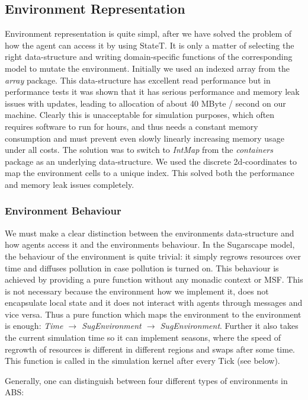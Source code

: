 \subsection{Environment Representation}
Environment representation is quite simpl, after we have solved the problem of how the agent can access it by using StateT. It is only a matter of selecting the right data-structure and writing domain-specific functions of the corresponding model to mutate the environment. Initially we used an indexed array from the \textit{array} package. This data-structure has excellent read performance but in performance tests it was shown that it has serious performance and memory leak issues with updates, leading to allocation of about 40 MByte / second on our machine. Clearly this is unacceptable for simulation purposes, which often requires software to run for hours, and thus needs a constant memory consumption and must prevent even slowly linearly increasing memory usage under all costs. The solution was to switch to \textit{IntMap} from the \textit{containers} package as an underlying data-structure. We used the discrete 2d-coordinates to map the environment cells to a unique index. This solved both the performance and memory leak issues completely.

\subsubsection{Environment Behaviour}
We must make a clear distinction between the environments data-structure and how agents access it and the environments behaviour. In the Sugarscape model, the behaviour of the environment is quite trivial: it simply regrows resources over time and diffuses pollution in case pollution is turned on. This behaviour is achieved by providing a pure function without any monadic context or MSF. This is not necessary because the environment how we implement it, does not encapsulate local state and it does not interact with agents through messages and vice versa. Thus a pure function which maps the environment to the environment is enough: \textit{Time $\rightarrow$ SugEnvironment $\rightarrow$ SugEnvironment}. Further it also takes the current simulation time so it can implement seasons, where the speed of regrowth of resources is different in different regions and swaps after some time. This function is called in the simulation kernel after every Tick (see below).

Generally, one can distinguish between four different types of environments in ABS:

